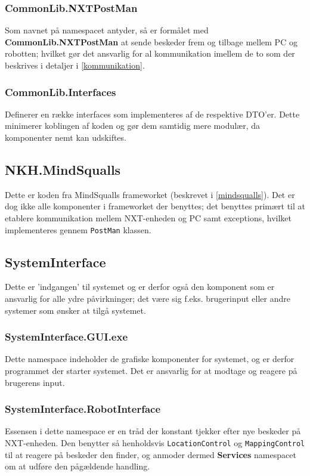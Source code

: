 \subsubsection{CommonLib.NXTPostMan}
Som navnet på namespacet antyder, så er formålet med \textbf{CommonLib.NXTPostMan} at sende beskeder frem og tilbage mellem PC og robotten; hvilket gør det ansvarlig for al kommunikation imellem de to som der beskrives i detaljer i \cref{kommunikation}.

\subsubsection{CommonLib.Interfaces}
Definerer en række interfaces som implementeres af de respektive DTO'er.
Dette minimerer koblingen af koden og gør dem samtidig mere modulær, da komponenter nemt kan udskiftes.

\subsection{NKH.MindSqualls}\label{arkitektur:mindsqualls}
Dette er koden fra MindSqualls frameworket (beskrevet i \cref{mindsqualls}).
Det er dog ikke alle komponenter i frameworket der benyttes; det benyttes primært til at etablere kommunikation mellem NXT-enheden og PC samt exceptions, hvilket implementeres gennem \lstinline[style=csharp]|PostMan| klassen.

\subsection{SystemInterface}\label{arkitektur:systeminterface}
Dette er 'indgangen' til systemet og er derfor også den komponent som er ansvarlig for alle ydre påvirkninger; det være sig f.eks. brugerinput eller andre systemer som ønsker at tilgå systemet.

\subsubsection{SystemInterface.GUI.exe}
Dette namespace indeholder de grafiske komponenter for systemet, og er derfor programmet der starter systemet.
Det er ansvarlig for at modtage og reagere på brugerens input.

\subsubsection{SystemInterface.RobotInterface}
Essensen i dette namespace er en tråd der konstant tjekker efter nye beskeder på NXT-enheden.
Den benytter så henholdsvis \lstinline[style=csharp]|LocationControl| og \lstinline[style=csharp]|MappingControl| til at reagere på beskeder den finder, og anmoder dermed \textbf{Services} namespacet om at udføre den pågældende handling.


